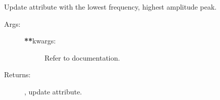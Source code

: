 \documentclass[letterpaper,10pt,english,openany,oneside]{sphinxmanual}
\begin{document}
\begin{fulllineitems}

\begin{fulllineitems}
\label{\detokenize{index:hvsrpy.Hvsr.update_peaks}}
Update  attribute with the lowest frequency, highest
amplitude peak.
\begin{description}
\item[{Args:}] \leavevmode\begin{description}
\item[{{\color{red}\bfseries{}**}kwargs:}] \leavevmode
Refer to {\hyperref[\detokenize{index:hvsrpy.Hvsr.find_peaks}]{}}
documentation.

\end{description}

\item[{Returns:}] \leavevmode
{}, update  attribute.

\end{description}

\end{fulllineitems}


\end{fulllineitems}




\renewcommand{\indexname}{Index}
\printindex
\end{document}
